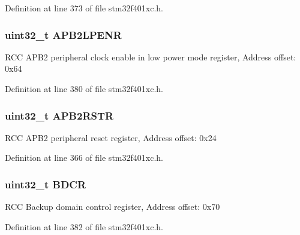 Definition at line 373 of file stm32f401xc.\+h.

\subsubsection[{\texorpdfstring{A\+P\+B2\+L\+P\+E\+NR}{APB2LPENR}}]{ uint32\+\_\+t A\+P\+B2\+L\+P\+E\+NR}\hypertarget{struct_r_c_c___type_def_aba51c57f9506e14a6f5983526c78943b}{}\label{struct_r_c_c___type_def_aba51c57f9506e14a6f5983526c78943b}
R\+CC A\+P\+B2 peripheral clock enable in low power mode register, Address offset\+: 0x64 

Definition at line 380 of file stm32f401xc.\+h.

\subsubsection[{\texorpdfstring{A\+P\+B2\+R\+S\+TR}{APB2RSTR}}]{ uint32\+\_\+t A\+P\+B2\+R\+S\+TR}\hypertarget{struct_r_c_c___type_def_ab2c5389c9ff4ac188cd498b8f7170968}{}\label{struct_r_c_c___type_def_ab2c5389c9ff4ac188cd498b8f7170968}
R\+CC A\+P\+B2 peripheral reset register, Address offset\+: 0x24 

Definition at line 366 of file stm32f401xc.\+h.

\subsubsection[{\texorpdfstring{B\+D\+CR}{BDCR}}]{ uint32\+\_\+t B\+D\+CR}\hypertarget{struct_r_c_c___type_def_a0b9a3ced775287c8585a6a61af4b40e9}{}\label{struct_r_c_c___type_def_a0b9a3ced775287c8585a6a61af4b40e9}
R\+CC Backup domain control register, Address offset\+: 0x70 

Definition at line 382 of file stm32f401xc.\+h.

